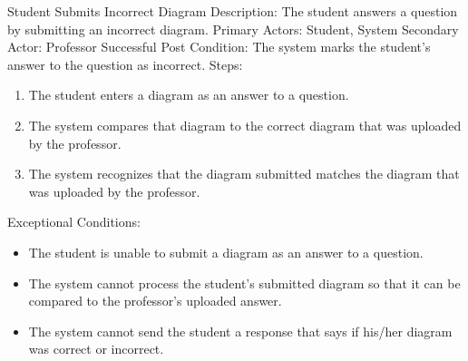     \begin{section}{Student Submits Incorrect Diagram}
        Description: The student answers a question by submitting an incorrect diagram. \newline
        Primary Actors: Student, System \newline
        Secondary Actor: Professor \newline
        Successful Post Condition: The system marks the student's answer to the question as incorrect. \newline
        Steps:
        \begin{enumerate}
            \item{The student enters a diagram as an answer to a question.}
            \item{The system compares that diagram to the correct diagram that was uploaded by the professor.}
            \item{The system recognizes that the diagram submitted matches the diagram that was uploaded by the professor.}
        \end{enumerate}
        Exceptional Conditions:
        \begin{itemize}
            \item{The student is unable to submit a diagram as an answer to a question.}
            \item{The system cannot process the student's submitted diagram so that it can be compared to the professor's uploaded answer.}
            \item{The system cannot send the student a response that says if his/her diagram was correct or incorrect.}
        \end{itemize}
    \end{section}
    
